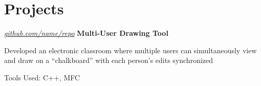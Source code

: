\section{Projects}

\begin{twocolentry}{
    \textit{\href{https://github.com/sinaatalay/rendercv}{github.com/name/repo}}}
    \textbf{Multi-User Drawing Tool}
\end{twocolentry}

\vspace{0.10 cm}
\begin{onecolentry}
    \begin{highlights}
        \item Developed an electronic classroom where multiple users can simultaneously view and draw on a ``chalkboard'' with each person's edits synchronized
        \item Tools Used: C++, MFC
    \end{highlights}
\end{onecolentry}